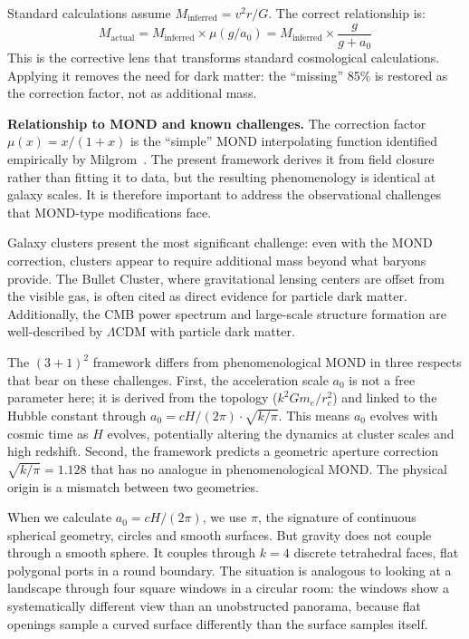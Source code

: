 \documentclass[aps,prd,preprint,superscriptaddress,showpacs,preprintnumbers,amsmath,amssymb,nofootinbib]{revtex4-2}
\begin{document}
Standard calculations assume $M_{\text{inferred}} = v^2 r / G$. The correct relationship is:
\begin{equation}
M_{\text{actual}} = M_{\text{inferred}} \times \mu(g/a_0) = M_{\text{inferred}} \times \frac{g}{g + a_0}
\label{eq:corrective-lens}
\end{equation}
This is the corrective lens that transforms standard cosmological calculations. Applying it removes the need for dark matter: the ``missing'' 85\% is restored as the correction factor, not as additional mass.

\textbf{Relationship to MOND and known challenges.} The correction factor $\mu(x) = x/(1+x)$ is the ``simple'' MOND interpolating function identified empirically by Milgrom~\cite{milgrom1983}. The present framework derives it from field closure rather than fitting it to data, but the resulting phenomenology is identical at galaxy scales. It is therefore important to address the observational challenges that MOND-type modifications face.

Galaxy clusters present the most significant challenge: even with the MOND correction, clusters appear to require additional mass beyond what baryons provide. The Bullet Cluster, where gravitational lensing centers are offset from the visible gas, is often cited as direct evidence for particle dark matter. Additionally, the CMB power spectrum and large-scale structure formation are well-described by $\Lambda$CDM with particle dark matter.

The $(3+1)^2$ framework differs from phenomenological MOND in three respects that bear on these challenges. First, the acceleration scale $a_0$ is not a free parameter here; it is derived from the topology ($k^2 G m_e / r_e^2$) and linked to the Hubble constant through $a_0 = cH/(2\pi) \cdot \sqrt{k/\pi}$. This means $a_0$ evolves with cosmic time as $H$ evolves, potentially altering the dynamics at cluster scales and high redshift. Second, the framework predicts a geometric aperture correction $\sqrt{k/\pi} = 1.128$ that has no analogue in phenomenological MOND. The physical origin is a mismatch between two geometries.

When we calculate $a_0 = cH/(2\pi)$, we use $\pi$, the signature of continuous spherical geometry, circles and smooth surfaces. But gravity does not couple through a smooth sphere. It couples through $k = 4$ discrete tetrahedral faces, flat polygonal ports in a round boundary. The situation is analogous to looking at a landscape through four square windows in a circular room: the windows show a systematically different view than an unobstructed panorama, because flat openings sample a curved surface differently than the surface samples itself.
\end{document}
